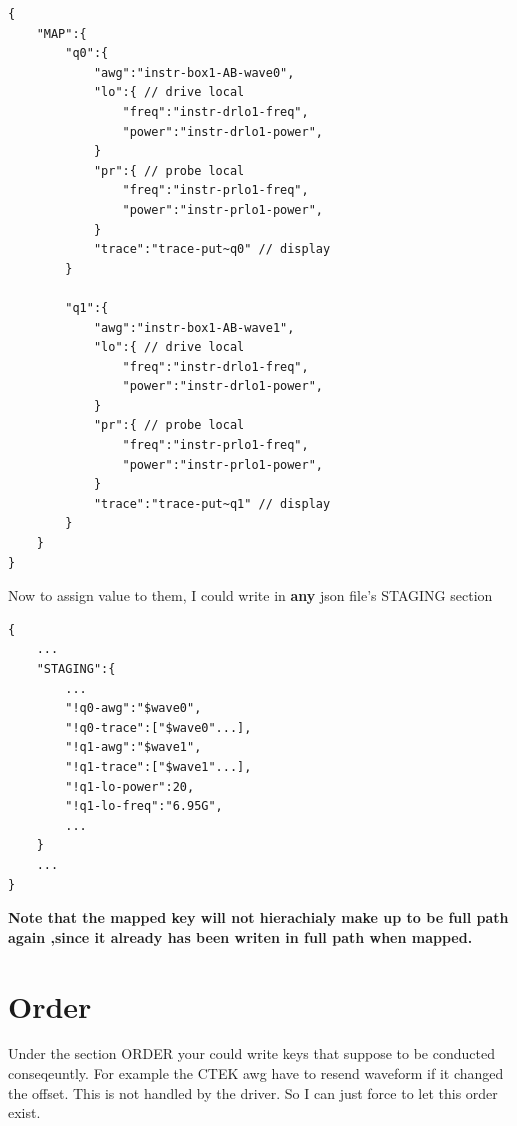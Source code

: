 \documentclass{article}
\begin{document}
\begin{lstlisting}
{
	"MAP":{
		"q0":{
			"awg":"instr-box1-AB-wave0",
			"lo":{ // drive local
				"freq":"instr-drlo1-freq",
				"power":"instr-drlo1-power",
			}
			"pr":{ // probe local
				"freq":"instr-prlo1-freq",
				"power":"instr-prlo1-power",
			}
			"trace":"trace-put~q0" // display
		}
		
		"q1":{
			"awg":"instr-box1-AB-wave1",
			"lo":{ // drive local
				"freq":"instr-drlo1-freq",
				"power":"instr-drlo1-power",
			}
			"pr":{ // probe local
				"freq":"instr-prlo1-freq",
				"power":"instr-prlo1-power",
			}
			"trace":"trace-put~q1" // display
		}
	}
}
\end{lstlisting}

Now to assign value to them, I could write in {\bf any} json file's STAGING section 


\begin{lstlisting}
{
	...
	"STAGING":{
		...
		"!q0-awg":"$wave0",
		"!q0-trace":["$wave0"...],
		"!q1-awg":"$wave1",
		"!q1-trace":["$wave1"...],
		"!q1-lo-power":20,
		"!q1-lo-freq":"6.95G",
		...
	}
	...
}
\end{lstlisting}
{ \bf Note that the mapped key will not hierachialy make up to be full path again ,since it already has been writen in full path when mapped.}


\section{Order}
Under the section ORDER your could write
 keys that suppose to be conducted conseqeuntly.
 For example the CTEK awg have to resend waveform if it changed the 
 offset.
This is not handled by the driver.
So I can just force to let this order exist.
\end{document}
